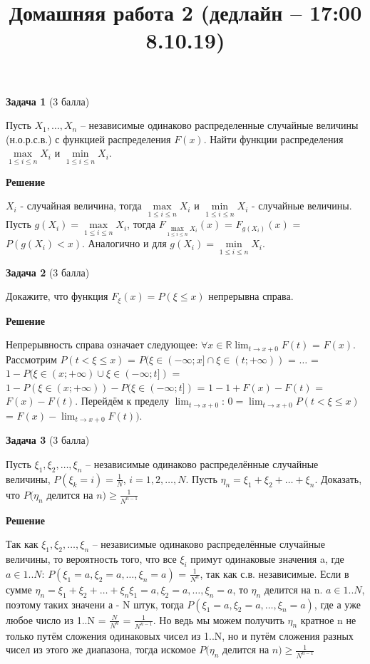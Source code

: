 \documentclass{article}
\title{Домашняя работа 2 (дедлайн -- 17:00 8.10.19)}
\begin{document}
\maketitle
\textbf{Задача 1} (3 балла)

Пусть $X_1, \dots, X_n$ -- независимые одинаково распределенные случайные 
величины (н.о.р.с.в.) с функцией распределения $F(x)$.
Найти функции распределения $\max\limits_{1 \leq i \leq n} X_i$ и $\min\limits_{1 \leq i 
\leq n} X_i$.

\textbf{Решение}

$X_i$ - случайная величина, тогда $\max\limits_{1 \leq i \leq n} X_i$ и $\min\limits_{1 \leq i \leq n} X_i$ - случайные величины. Пусть $g(X_i) = \max\limits_{1 \leq i \leq n} X_i$, тогда $F_{\max\limits_{1 \leq i \leq n} X_i}(x)$ = $F_{g(X_i)}(x)$ = $P(g(X_i) < x)$. Аналогично и для $g(X_i) = \min\limits_{1 \leq i \leq n} X_i$.


\textbf{Задача 2} (3 балла)

Докажите, что функция $F_{\xi}(x) = P(\xi \leq x)$ непрерывна справа.

\textbf{Решение}

Непрерывность справа означает следующее: $\forall x \in \mathbb{R} \lim_{t\to x+0}F(t)$ = $F(x)$. Рассмотрим $P(t<\xi\leq x)$ = $P(\xi \in (-\infty;x] \cap \xi \in (t; +\infty))$ = $\dots$ = $1 - P(\xi \in (x; +\infty) \cup \xi \in (-\infty; t])$ = $1 - P(\xi \in (x; +\infty)) - P(\xi \in (-\infty; t])$ = $1 - 1 + F(x) - F(t)$ = $F(x) - F(t)$. Перейдём к пределу $\lim_{t\to x+0}$: $0 = \lim_{t\to x+0} P(t < \xi \leq x)$ = $F(x) - \lim_{t\to x+0} F(t))$.

\textbf{Задача 3} (3 балла)

Пусть $\xi_1, \xi_2, \dots, \xi_n$ -- независимые одинаково распределённые случайные величины, $P(\xi_k = i) = \frac{1}{N}$, $i = 1, 2, \dots, N$. Пусть $\eta_n = \xi_1 + \xi_2 + \dots + \xi_n$. Доказать, что $P(\eta_n$ делится на $n) \geq \frac{1}{N^{n-1}}$

\textbf{Решение}

Так как $\xi_1, \xi_2, \dots, \xi_n$ -- независимые одинаково распределённые случайные величины, то вероятность того, что все $\xi_i$ примут одинаковые значения a, где $a \in {1..N}$: $P(\xi_1 = a, \xi_2 = a, \dots, \xi_n = a)$ = $\frac{1}{N^n}$, так как с.в. независимые. Если в сумме $\eta_n = \xi_1 + \xi_2 + \dots + \xi_n \xi_1 = a, \xi_2 = a, \dots, \xi_n = a$, то $\eta_n$ делится на n. $a \in {1..N}$, поэтому таких значени а - N штук, тогда $P(\xi_1 = a, \xi_2 = a, \dots, \xi_n = a)$, где а уже любое число из {1..N} = $\frac{N}{N^n}$ = $\frac{1}{N^{n-1}}$. Но ведь мы можем получить $\eta_n$ кратное n не только путём сложения одинаковых чисел из {1..N}, но и путём сложения разных чисел из этого же диапазона, тогда искомое $P(\eta_n$ делится на $n) \geq \frac{1}{N^{n-1}}$
\end{document}
